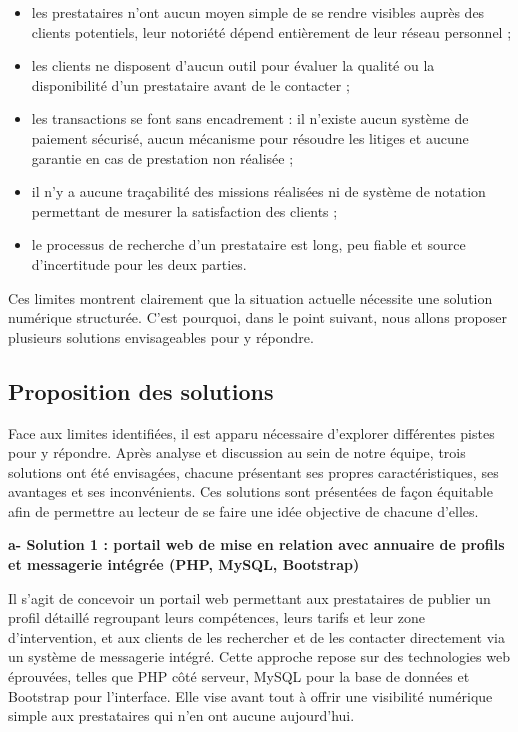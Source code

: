 \begin{itemize}
	\item les prestataires n'ont aucun moyen simple de se rendre visibles auprès des clients potentiels, leur notoriété dépend entièrement de leur réseau personnel ;
	\item les clients ne disposent d'aucun outil pour évaluer la qualité ou la disponibilité d'un prestataire avant de le contacter ;
	\item les transactions se font sans encadrement : il n'existe aucun système de paiement sécurisé, aucun mécanisme pour résoudre les litiges et aucune garantie en cas de prestation non réalisée ;
	\item il n'y a aucune traçabilité des missions réalisées ni de système de notation permettant de mesurer la satisfaction des clients ;
	\item le processus de recherche d'un prestataire est long, peu fiable et source d'incertitude pour les deux parties.
\end{itemize}

Ces limites montrent clairement que la situation actuelle nécessite une solution numérique structurée. C'est pourquoi, dans le point suivant, nous allons proposer plusieurs solutions envisageables pour y répondre.

\subsection{Proposition des solutions}

Face aux limites identifiées, il est apparu nécessaire d'explorer différentes pistes pour y répondre. Après analyse et discussion au sein de notre équipe, trois solutions ont été envisagées, chacune présentant ses propres caractéristiques, ses avantages et ses inconvénients. Ces solutions sont présentées de façon équitable afin de permettre au lecteur de se faire une idée objective de chacune d'elles.

\vspace{0.4cm}
\noindent\textbf{\textcolor{vertCongo}{a- Solution 1 : portail web de mise en relation avec annuaire de profils et messagerie intégrée (PHP, MySQL, Bootstrap)}}

\vspace{0.3cm}
Il s'agit de concevoir un portail web permettant aux prestataires de publier un profil détaillé regroupant leurs compétences, leurs tarifs et leur zone d'intervention, et aux clients de les rechercher et de les contacter directement via un système de messagerie intégré. Cette approche repose sur des technologies web éprouvées, telles que PHP côté serveur, MySQL pour la base de données et Bootstrap pour l'interface. Elle vise avant tout à offrir une visibilité numérique simple aux prestataires qui n'en ont aucune aujourd'hui.

